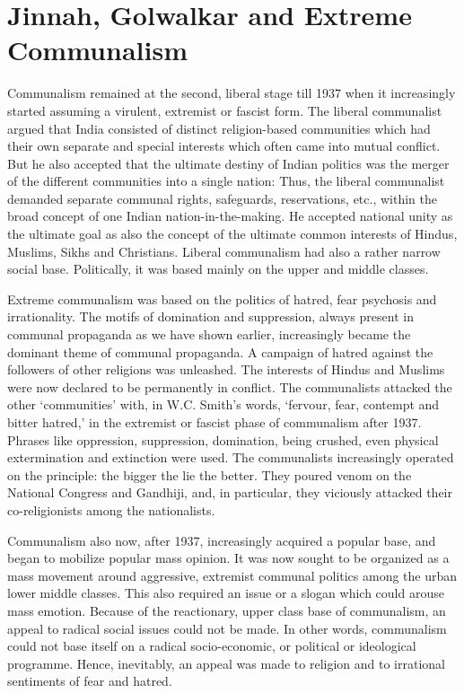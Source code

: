 \chapter{Jinnah, Golwalkar and Extreme Communalism}
\begin{multicols}{2}

Communalism remained at the second, liberal stage till 1937 when it increasingly started assuming a virulent, extremist or fascist form. The liberal communalist argued that India consisted of distinct religion-based communities which had their own separate and special interests which often came into mutual conflict. But he also accepted that the ultimate destiny of Indian politics was the merger of the different communities into a single nation: Thus, the liberal communalist demanded separate communal rights, safeguards, reservations, etc., within the broad concept of one Indian nation-in-the-making. He accepted national unity as the ultimate goal as also the concept of the ultimate common interests of Hindus, Muslims, Sikhs and Christians. Liberal communalism had also a rather narrow social base. Politically, it was based mainly on the upper and middle classes. 

Extreme communalism was based on the politics of hatred, fear psychosis and irrationality. The motifs of domination and suppression, always present in communal propaganda as we have shown earlier, increasingly became the dominant theme of communal propaganda. A campaign of hatred against the followers of other religions was unleashed. The interests of Hindus and Muslims were now declared to be permanently in conflict. The communalists attacked the other `communities' with, in W.C. Smith's words, `fervour, fear, contempt and bitter hatred,' in the extremist or fascist phase of communalism after 1937. Phrases like oppression, suppression, domination, being crushed, even physical extermination and extinction were used. The communalists increasingly operated on the principle: the bigger the lie the better. They poured venom on the National Congress and Gandhiji, and, in particular, they viciously attacked their co-religionists among the nationalists. 

Communalism also now, after 1937, increasingly acquired a popular base, and began to mobilize popular mass opinion. It was now sought to be organized as a mass movement around aggressive, extremist communal politics among the urban lower middle classes. This also required an issue or a slogan which could arouse mass emotion. Because of the reactionary, upper class base of communalism, an appeal to radical social issues could not be made. In other words, communalism could not base itself on a radical socio-economic, or political or ideological programme. Hence, inevitably, an appeal was made to religion and to irrational sentiments of fear and hatred. 


\end{multicols}
